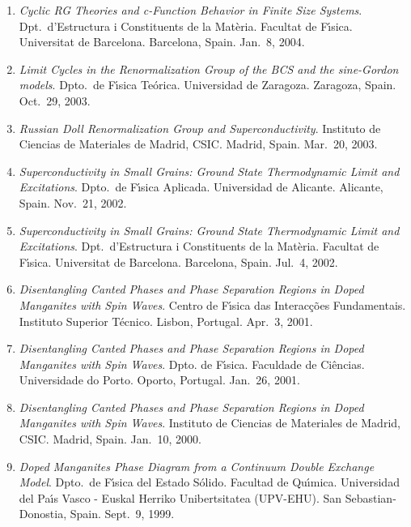\documentclass{article}
\begin{document}
\begin{enumerate}
\item
{\it Cyclic RG Theories and c-Function Behavior in Finite Size Systems}.
Dpt.~d'Estruc\-tura i Constituents de la Mat\`eria.
Facultat de F\'{\i}sica. Universitat de Barcelona.
Barcelona, Spain.
Jan.~8, 2004.

\item
{\it Limit Cycles in the Renormalization Group of the BCS and the sine-Gordon models}. 
Dpto.\ de F\'{\i}sica Te\'orica. Universidad de Zaragoza.
Zaragoza, Spain.
Oct.~29, 2003.

\item
{\it Russian Doll Renormalization Group and Superconductivity}. 
Instituto de Ciencias de Materiales de Madrid, CSIC. 
Madrid, Spain.
Mar.~20, 2003.

\item
{\it Superconductivity in Small Grains: Ground State Thermodynamic 
Limit and Excitations}.
Dpto.~de F\'{\i}sica Aplicada. Universidad de Alicante.
Alicante, Spain.
Nov.~21, 2002.

\item
{\it Superconductivity in Small Grains: Ground State Thermodynamic 
Limit and Excitations}.
Dpt.~d'Estruc\-tura i Constituents de la Mat\`eria.
Facultat de F\'{\i}sica. Universitat de Barcelona.
Barcelona, Spain.
Jul.~4, 2002.

\item 
{\it Disentangling Canted Phases and Phase Separation Regions 
in Doped Manganites with Spin Waves}.
Centro de F\'{\i}sica das Interac\c c\~oes Fundamentais. 
Instituto Superior T\'ecnico.
Lisbon, Portugal.
Apr.~3, 2001.

\item 
{\it Disentangling Canted Phases and Phase Separation Regions 
in Doped Manganites with Spin Waves}.
Dpto. de F\'{\i}sica. 
Faculdade de Ci\^encias.
Universidade do Porto.
Oporto, Portugal.
Jan.~26, 2001.

\item 
{\it Disentangling Canted Phases and Phase Separation Regions 
in Doped Manganites with Spin Waves}.
Instituto de Ciencias de Materiales de Madrid, CSIC. 
Madrid, Spain.
Jan.~10, 2000.

\item 
{\it Doped Manganites Phase Diagram from a Continuum Double Exchange Model}. 
Dpto.~de F\'{\i}sica del Estado S\'olido. Facultad de Qu{\'\i}mica.  
Universidad del Pa\'{\i}s Vasco - Euskal Herriko Unibertsitatea (UPV-EHU). 
San Sebastian-Donostia, Spain.
Sept.~9, 1999.


\end{enumerate}
\end{document}
